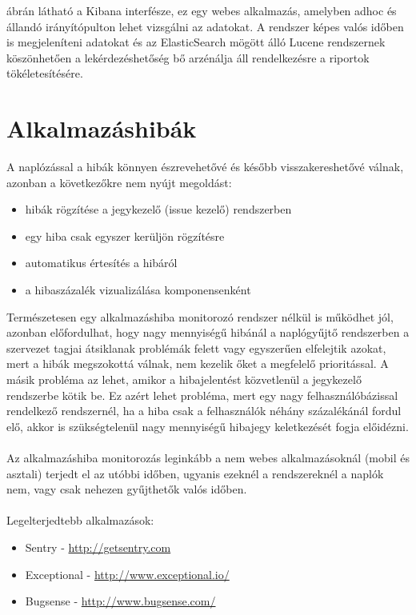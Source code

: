  ábrán látható a Kibana interfésze, ez egy webes alkalmazás, amelyben adhoc és állandó irányítópulton lehet vizsgálni az adatokat. A rendszer képes valós időben is megjeleníteni adatokat és az ElasticSearch mögött álló Lucene rendszernek köszönhetően a lekérdezéshetőség bő arzénálja áll rendelkezésre a riportok tökéletesítésére.

\section{Alkalmazáshibák\\}
A naplózással a hibák könnyen észrevehetővé és később visszakereshetővé válnak, azonban a következőkre nem nyújt megoldást:\\
\begin{itemize}
\item hibák rögzítése a jegykezelő (issue kezelő) rendszerben
\item egy hiba csak egyszer kerüljön rögzítésre
\item automatikus értesítés a hibáról
\item a hibaszázalék vizualizálása komponensenként
\end{itemize}

Természetesen egy alkalmazáshiba monitorozó rendszer nélkül is működhet jól, azonban előfordulhat, hogy nagy mennyiségű hibánál a naplógyűjtő rendszerben a szervezet tagjai átsiklanak problémák felett vagy egyszerűen elfelejtik azokat, mert a hibák megszokottá válnak, nem kezelik őket a megfelelő prioritással. A másik probléma az lehet, amikor a hibajelentést közvetlenül a jegykezelő rendszerbe kötik be. Ez azért lehet probléma, mert egy nagy felhasználóbázissal rendelkező rendszernél, ha a hiba csak a felhasználók néhány százalékánál fordul elő, akkor is szükségtelenül nagy mennyiségű hibajegy keletkezését fogja előidézni.\\
\hfill\\
Az alkalmazáshiba monitorozás leginkább a nem webes alkalmazásoknál (mobil és asztali) terjedt el az utóbbi időben, ugyanis ezeknél a rendszereknél a naplók nem, vagy csak nehezen gyűjthetők valós időben.\\
\hfill\\
Legelterjedtebb alkalmazások:
\begin{itemize}
\item Sentry - \url{http://getsentry.com}
\item Exceptional - \url{http://www.exceptional.io/}
\item Bugsense - \url{http://www.bugsense.com/}
\end{itemize}

